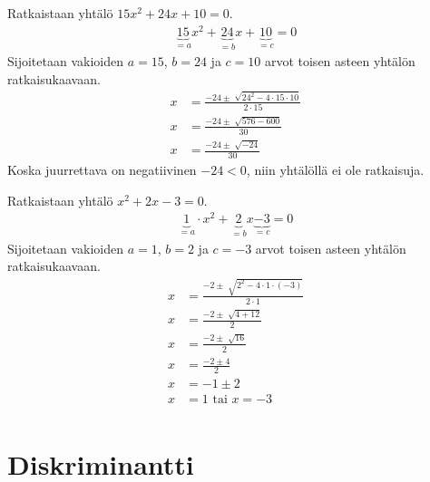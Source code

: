 \begin{esimerkki}
Ratkaistaan yhtälö $15x^2+24x+10=0$.
\begin{align*}
\underbrace{15}_{=a}x^2+\underbrace{24}_{=b}x+\underbrace{10}_{=c}=0
\end{align*}
Sijoitetaan vakioiden $a=15$, $b=24$ ja $c=10$ arvot toisen asteen yhtälön ratkaisukaavaan.
\begin{align*}
x&=\frac{-24 \pm \sqrt[]{24^2-4 \cdot 15 \cdot 10}}{2 \cdot 15} \\
x&=\frac{-24 \pm \sqrt[]{576-600}}{30} \\
x&=\frac{-24 \pm \sqrt[]{-24}}{30}
\end{align*}
Koska juurrettava on negatiivinen $-24<0$, niin yhtälöllä ei ole ratkaisuja. \\
\end{esimerkki}

\begin{esimerkki}
Ratkaistaan yhtälö $x^2+2x-3=0$.
\begin{align*}
\underbrace{1}_{=a} \cdot x^2+\underbrace{2}_{=b}x\underbrace{-3}_{=c}=0
\end{align*}
Sijoitetaan vakioiden $a=1$, $b=2$ ja $c=-3$ arvot toisen asteen yhtälön ratkaisukaavaan.
\begin{align*}
x&=\frac{-2 \pm \sqrt[]{2^2-4 \cdot 1 \cdot (-3)}}{2 \cdot 1} \\
x&=\frac{-2 \pm \sqrt[]{4+12}}{2} \\
x&=\frac{-2 \pm \sqrt[]{16}}{2} \\
x&=\frac{-2 \pm 4}{2} \\
x&=-1 \pm 2 \\
x&=1 \text{ tai } x=-3 \\
\end{align*}
\end{esimerkki}


\section{Diskriminantti}

